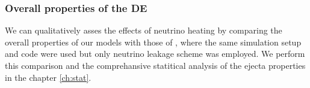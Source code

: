 \subsubsection{Overall properties of the \ac{DE}}


We can qualitatively asses the effects of neutrino heating by comparing the overall 
properties of our models with those of \citet{Radice:2018pdn}, where the same 
simulation setup and code were used but only neutrino leakage scheme was employed.
%
We perform this comparison and the comprehansive statitical analysis of the 
ejecta properties in the chapter \ref{ch:stat}.
%
%
